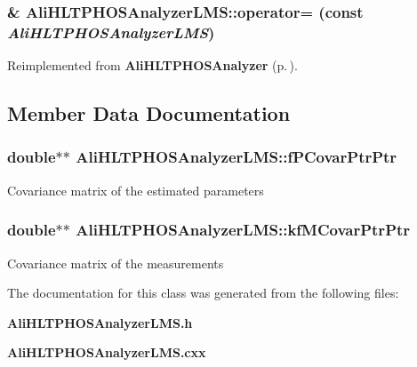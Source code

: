 \subsubsection{\& Ali\-HLTPHOSAnalyzer\-LMS::operator= (const  {\em Ali\-HLTPHOSAnalyzer\-LMS})\hspace{0.3cm}{\tt  [inline]}}\label{classAliHLTPHOSAnalyzerLMS_a3}




Reimplemented from {\bf Ali\-HLTPHOSAnalyzer} {\rm (p.\,\pageref{classAliHLTPHOSAnalyzer_a4})}.

\subsection{Member Data Documentation}
\subsubsection{\setlength{\rightskip}{0pt plus 5cm}double$\ast$$\ast$ {\bf Ali\-HLTPHOSAnalyzer\-LMS::f\-PCovar\-Ptr\-Ptr}\hspace{0.3cm}{\tt  [private]}}\label{classAliHLTPHOSAnalyzerLMS_r1}


Covariance matrix of the estimated parameters 
\subsubsection{\setlength{\rightskip}{0pt plus 5cm}double$\ast$$\ast$ {\bf Ali\-HLTPHOSAnalyzer\-LMS::kf\-MCovar\-Ptr\-Ptr}\hspace{0.3cm}{\tt  [private]}}\label{classAliHLTPHOSAnalyzerLMS_r0}


Covariance matrix of the measurements 

The documentation for this class was generated from the following files:\begin{CompactItemize}
\item 
{\bf Ali\-HLTPHOSAnalyzer\-LMS.h}\item 
{\bf Ali\-HLTPHOSAnalyzer\-LMS.cxx}\end{CompactItemize}

